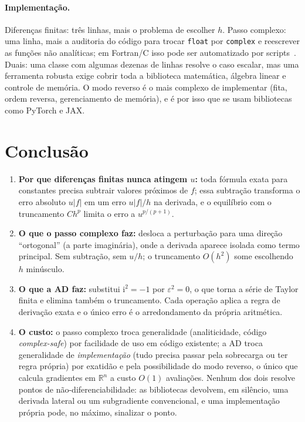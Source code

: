 \documentclass[11pt,a4paper]{article}
\begin{document}
\paragraph{Implementação.} Diferenças finitas: três linhas, mais o problema de escolher $h$. Passo complexo: uma linha, mais a auditoria do código para trocar \texttt{float} por \texttt{complex} e reescrever as funções não analíticas; em Fortran/C isso pode ser automatizado por scripts~\cite{martins2003}. Duais: uma classe com algumas dezenas de linhas resolve o caso escalar, mas uma ferramenta robusta exige cobrir toda a biblioteca matemática, álgebra linear e controle de memória. O modo reverso é o mais complexo de implementar (fita, ordem reversa, gerenciamento de memória), e é por isso que se usam bibliotecas como PyTorch e JAX.

\section{Conclusão}

\begin{enumerate}
\item \textbf{Por que diferenças finitas nunca atingem $u$:} toda fórmula exata para constantes precisa subtrair valores próximos de $f$; essa subtração transforma o erro absoluto $u|f|$ em um erro $u|f|/h$ na derivada, e o equilíbrio com o truncamento $Ch^p$ limita o erro a $u^{p/(p+1)}$.
\item \textbf{O que o passo complexo faz:} desloca a perturbação para uma direção ``ortogonal'' (a parte imaginária), onde a derivada aparece isolada como termo principal. Sem subtração, sem $u/h$; o truncamento $O(h^2)$ some escolhendo $h$ minúsculo.
\item \textbf{O que a AD faz:} substitui $\mathrm i^2=-1$ por $\varepsilon^2=0$, o que torna a série de Taylor finita e elimina também o truncamento. Cada operação aplica a regra de derivação exata e o único erro é o arredondamento da própria aritmética.
\item \textbf{O custo:} o passo complexo troca generalidade (analiticidade, código \emph{complex-safe}) por facilidade de uso em código existente; a AD troca generalidade de \emph{implementação} (tudo precisa passar pela sobrecarga ou ter regra própria) por exatidão e pela possibilidade do modo reverso, o único que calcula gradientes em $\mathbb R^n$ a custo $O(1)$ avaliações. Nenhum dos dois resolve pontos de não-diferenciabilidade: as bibliotecas devolvem, em silêncio, uma derivada lateral ou um subgradiente convencional, e uma implementação própria pode, no máximo, sinalizar o ponto.
\end{enumerate}
\end{document}
